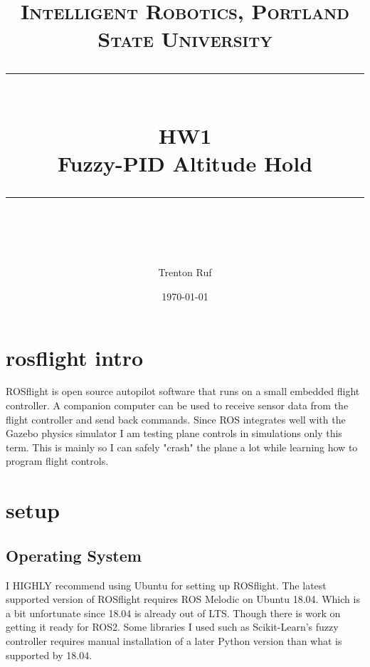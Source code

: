 \documentclass[11pt]{scrartcl} %
\title{	
	\normalfont\normalsize
	\textsc{Intelligent Robotics, Portland State University}\\ %
	\vspace{25pt} %
	\rule{\linewidth}{0.5pt}\\ %
	\vspace{20pt} %
	{\huge HW1}\\ %
	\vspace{4pt} %
	{\large Fuzzy-PID Altitude Hold}\\ %
	\vspace{12pt} %
	\rule{\linewidth}{2pt}\\ %
	\vspace{12pt} %
}
\author{\LARGE Trenton Ruf} %
\date{\normalsize \today} %
\begin{document}
\maketitle %




\renewcommand\thesubsection{\Roman{subsection}}
\section{rosflight intro}

ROSflight is open source autopilot software that runs on a small embedded flight controller. A companion computer can be used to receive sensor data from the flight controller and send back commands. Since ROS integrates well with the Gazebo physics simulator I am testing plane controls in simulations only this term. This is mainly so I can safely "crash" the plane a lot while learning how to program flight controls.

\section{setup}
\subsection{Operating System}
I HIGHLY recommend using Ubuntu for setting up ROSflight.
The latest supported version of ROSflight requires ROS Melodic on Ubuntu 18.04. Which is a bit unfortunate since 18.04 is already out of LTS. Though there is work on getting it ready for ROS2. Some libraries I used such as Scikit-Learn's fuzzy controller requires manual installation of a later Python version than what is supported by 18.04.
\end{document}
